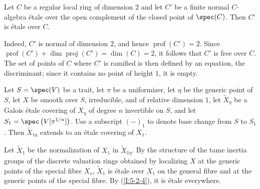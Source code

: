 \documentclass[oneside]{book}
\begin{document}
\begin{lemma} \label{I:5-2-4} %
Let $C$ be a regular local ring of dimension $2$ and let $C'$ be a
finite normal $C$-algebra étale over the open complement of the closed
point of $\spec(C)$. Then $C'$ is étale over $C$.
\end{lemma}

Indeed, $C'$ is normal of dimension $2$, and hence
$\operatorname{prof}(C')=2$. Since
$\operatorname{prof}(C')+\dim\operatorname{proj}(C')=\dim(C)=2$, it
follows that $C'$ is free over $C$. The set of points of $C$ where $C'$
is ramified is then defined by an equation, the discriminant; since it
contains no point of height $1$, it is empty.

\begin{lemma}\label{I:5-2-5} %
Let $S=\spec(V)$ be a trait, let $\pi$ be a uniformizer, let $\eta$ be
the generic point of $S$, let $X$ be smooth over $S$, irreducible, and
of relative dimension $1$, let $\widetilde X_\eta$ be a Galois étale
covering of $X_\eta$ of degree $n$ invertible on $S$, and let
$S_1=\spec\left(V[\pi^{1/n}]\right)$. Use a subscript $(-)_1$ to denote
base change from $S$ to $S_1$. Then $\widetilde X_{1\eta}$ extends to an
étale covering of $X_1$.
\end{lemma}

Let $\widetilde X_1$ be the normalization of $X_1$ in
$\widetilde X_{1\eta}$. By the structure of the tame inertia groups of
the discrete valuation rings obtained by localizing $X$ at the generic
points of the special fibre $X_s$, $\widetilde X_1$ is étale over $X_1$
on the general fibre and at the generic points of the special fibre. By
(\ref{I:5-2-4}), it is étale everywhere.

\subsubsection{}\label{I:5-2-6} %
\end{document}
